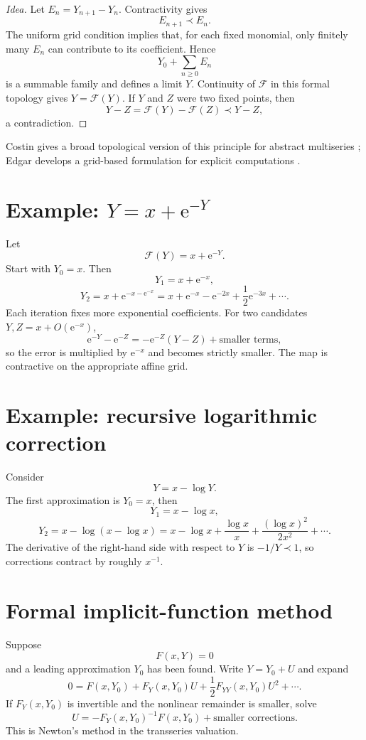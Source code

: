 \documentclass[11pt,oneside]{book}
\theoremstyle{definition}
\theoremstyle{remark}
\newcommand{\e}{\mathrm{e}}
\newcommand{\bigO}{O}
\newcommand{\precdom}{\prec}
\begin{document}
\begin{proof}[Idea]
Let $E_n=Y_{n+1}-Y_n$. Contractivity gives
\[
  E_{n+1}\precdom E_n.
\]
The uniform grid condition implies that, for each fixed monomial, only finitely
many $E_n$ can contribute to its coefficient. Hence
\[
  Y_0+\sum_{n\ge0}E_n
\]
is a summable family and defines a limit $Y$. Continuity of $\mathcal F$ in this
formal topology gives $Y=\mathcal F(Y)$. If $Y$ and $Z$ were two fixed points,
then
\[
  Y-Z=\mathcal F(Y)-\mathcal F(Z)\precdom Y-Z,
\]
a contradiction.
\end{proof}

Costin gives a broad topological version of this principle for abstract
multiseries \cite{CostinTopological}; Edgar develops a grid-based formulation
for explicit computations \cite{EdgarBeginners}.

\section{Example: \texorpdfstring{$Y=x+\e^{-Y}$}{Y = x + exp(-Y)}}

Let
\[
  \mathcal F(Y)=x+\e^{-Y}.
\]
Start with $Y_0=x$. Then
\[
  Y_1=x+\e^{-x},
\]
\[
  Y_2=x+\e^{-x-\e^{-x}}
     =x+\e^{-x}-\e^{-2x}+\frac12\e^{-3x}+\cdots.
\]
Each iteration fixes more exponential coefficients. For two candidates
$Y,Z=x+\bigO(\e^{-x})$,
\[
  \e^{-Y}-\e^{-Z}
  =-\e^{-Z}(Y-Z)+\text{smaller terms},
\]
so the error is multiplied by $\e^{-x}$ and becomes strictly smaller. The map is
contractive on the appropriate affine grid.

\section{Example: recursive logarithmic correction}

Consider
\[
  Y=x-\log Y.
\]
The first approximation is $Y_0=x$, then
\[
  Y_1=x-\log x,
\]
\[
  Y_2=x-\log(x-\log x)
  =x-\log x+\frac{\log x}{x}
   +\frac{(\log x)^2}{2x^2}+\cdots.
\]
The derivative of the right-hand side with respect to $Y$ is $-1/Y\precdom1$,
so corrections contract by roughly $x^{-1}$.

\section{Formal implicit-function method}

Suppose
\[
  F(x,Y)=0
\]
and a leading approximation $Y_0$ has been found. Write $Y=Y_0+U$ and expand
\[
  0=F(x,Y_0)+F_Y(x,Y_0)U+\frac12F_{YY}(x,Y_0)U^2+\cdots.
\]
If $F_Y(x,Y_0)$ is invertible and the nonlinear remainder is smaller, solve
\[
  U=-F_Y(x,Y_0)^{-1}F(x,Y_0)+\text{smaller corrections}.
\]
This is Newton's method in the transseries valuation.
\end{document}
